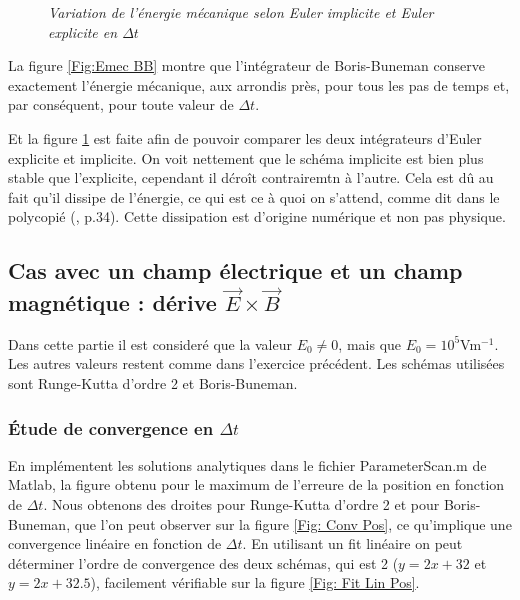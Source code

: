 \documentclass[a4paper,12pt,twoside]{article}
\begin{document}
\begin{figure}[h]
\begin{minipage}[c]{.46\linewidth}
				\caption{\em\label{Fig: Emec EI2} Variation de l'\'energie m\'ecanique selon Euler implicite et Euler explicite  en $\Delta t$}
			\end{minipage}
		\end{figure}
	
	La figure \ref{Fig:Emec BB} montre que l'int\'egrateur de Boris-Buneman conserve exactement l'\'energie m\'ecanique, aux arrondis pr\`es, pour tous les pas de temps et, par cons\'equent, pour toute valeur de $\Delta t$.
	
	Et la figure \ref{Fig: Emec EI2} est faite  afin de pouvoir comparer les deux int\'egrateurs d'Euler explicite et implicite. On voit nettement que le sch\'ema implicite est bien plus stable que l'explicite, cependant il d\'cro\^it contrairemtn \`a l'autre. Cela est d\^u au fait qu'il dissipe de l'\'energie, ce qui est ce \`a quoi on s'attend, comme dit dans le polycopi\'e (\cite{NdC}, p.34). Cette dissipation est d'origine num\'erique et non pas physique.
		
	
\subsection{Cas avec un champ \'electrique et un champ magn\'etique : d\'erive $\Vec{E}\times\Vec{B}$}
Dans cette partie il est consider\'e que la valeur $E_0 \ne 0$, mais que $E_0 = 10^5$Vm$^{-1}$. Les autres valeurs restent comme dans l'exercice pr\'ec\'edent. Les sch\'emas utilis\'ees sont Runge-Kutta d'ordre 2 et Boris-Buneman.
	\subsubsection{\'Etude de convergence en $\Delta t$}
	En impl\'ementent les solutions analytiques dans le fichier ParameterScan.m de Matlab, la figure obtenu pour le maximum de l'erreure de la position en fonction de $\Delta t$. Nous obtenons des droites pour Runge-Kutta d'ordre 2 et pour Boris-Buneman, que l'on peut observer sur la figure \ref{Fig: Conv Pos}, ce qu'implique une convergence lin\'eaire en fonction de $\Delta t$. En utilisant un fit lin\'eaire on peut d\'eterminer l'ordre de convergence des deux sch\'emas, qui est 2 ($y = 2x + 32$ et $y = 2x + 32.5$), facilement v\'erifiable sur la figure \ref{Fig: Fit Lin Pos}.
	
\end{document}
